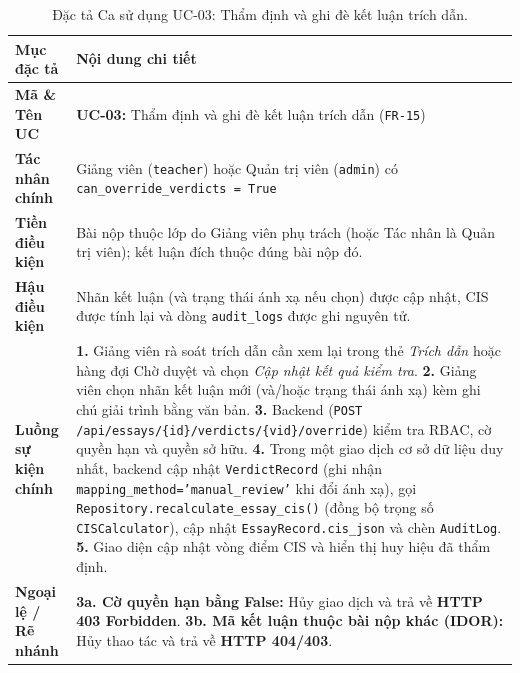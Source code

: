 \begin{table}[!htbp]
\centering
\caption{Đặc tả Ca sử dụng UC-03: Thẩm định và ghi đè kết luận trích dẫn.}\label{tab:uc03}
\begin{tabular}{|L{0.24}|L{0.76}|}
\hline
\textbf{Mục đặc tả} & \textbf{Nội dung chi tiết} \\
\hline
\textbf{Mã \& Tên UC} & \textbf{UC-03:} Thẩm định và ghi đè kết luận trích dẫn (\texttt{FR-15}) \\
\hline
\textbf{Tác nhân chính} & Giảng viên (\texttt{teacher}) hoặc Quản trị viên (\texttt{admin}) có \texttt{can\_override\_verdicts = True} \\
\hline
\textbf{Tiền điều kiện} & Bài nộp thuộc lớp do Giảng viên phụ trách (hoặc Tác nhân là Quản trị viên); kết luận đích thuộc đúng bài nộp đó. \\
\hline
\textbf{Hậu điều kiện} & Nhãn kết luận (và trạng thái ánh xạ nếu chọn) được cập nhật, CIS được tính lại và dòng \texttt{audit\_logs} được ghi nguyên tử. \\
\hline
\textbf{Luồng sự kiện chính} & \textbf{1.} Giảng viên rà soát trích dẫn cần xem lại trong thẻ \textit{Trích dẫn} hoặc hàng đợi Chờ duyệt và chọn \textit{Cập nhật kết quả kiểm tra}. \newline \textbf{2.} Giảng viên chọn nhãn kết luận mới (và/hoặc trạng thái ánh xạ) kèm ghi chú giải trình bằng văn bản. \newline \textbf{3.} Backend (\texttt{POST /api/essays/\{id\}/verdicts/\{vid\}/override}) kiểm tra RBAC, cờ quyền hạn và quyền sở hữu. \newline \textbf{4.} Trong một giao dịch cơ sở dữ liệu duy nhất, backend cập nhật \texttt{VerdictRecord} (ghi nhận \texttt{mapping\_method='manual\_review'} khi đổi ánh xạ), gọi \texttt{Repository.recalculate\_essay\_cis()} (đồng bộ trọng số \texttt{CISCalculator}), cập nhật \texttt{EssayRecord.\allowbreak{}cis\_json} và chèn \texttt{AuditLog}. \newline \textbf{5.} Giao diện cập nhật vòng điểm CIS và hiển thị huy hiệu đã thẩm định. \\
\hline
\textbf{Ngoại lệ / Rẽ nhánh} & \textbf{3a. Cờ quyền hạn bằng False:} Hủy giao dịch và trả về \textbf{HTTP 403 Forbidden}. \newline \textbf{3b. Mã kết luận thuộc bài nộp khác (IDOR):} Hủy thao tác và trả về \textbf{HTTP 404/403}. \\
\hline
\end{tabular}
\end{table}

